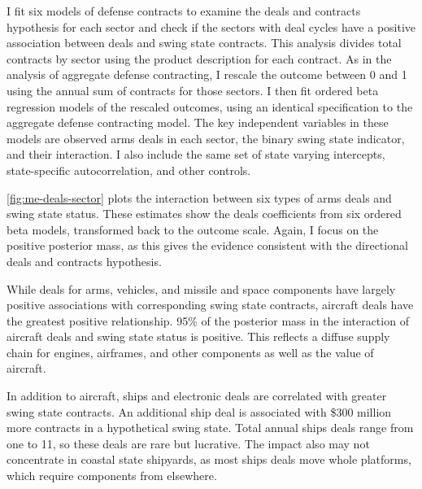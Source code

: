 \documentclass[12pt]{article}
\begin{document}
I fit six models of defense contracts to examine the deals and contracts hypothesis for each sector and check if the sectors with deal cycles have a positive association between deals and swing state contracts. 
This analysis divides total contracts by sector using the product description for each contract. 
As in the analysis of aggregate defense contracting, I rescale the outcome between 0 and 1 using the annual sum of contracts for those sectors. 
I then fit ordered beta regression models of the rescaled outcomes, using an identical specification to the aggregate defense contracting model.
The key independent variables in these models are observed arms deals in each sector, the binary swing state indicator, and their interaction. 
I also include the same set of state varying intercepts, state-specific autocorrelation, and other controls. 


\autoref{fig:me-deals-sector} plots the interaction between six types of arms deals and swing state status.  
These estimates show the deals coefficients from six ordered beta models, transformed back to the outcome scale. 
Again, I focus on the positive posterior mass, as this gives the evidence consistent with the directional deals and contracts hypothesis.

While deals for arms, vehicles, and missile and space components have largely positive associations with corresponding swing state contracts, aircraft deals have the greatest positive relationship. 
95\% of the posterior mass in the interaction of aircraft deals and swing state status is positive.
This reflects a diffuse supply chain for engines, airframes, and other components as well as the value of aircraft.


In addition to aircraft, ships and electronic deals are correlated with greater swing state contracts. 
An additional ship deal is associated with \$300 million more contracts in a hypothetical swing state. 
Total annual ships deals range from one to 11, so these deals are rare but lucrative. 
The impact also may not concentrate in coastal state shipyards, as most ships deals move whole platforms, which require components from elsewhere. 
\end{document}
